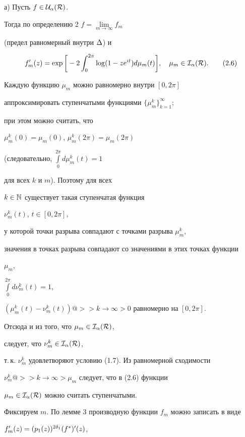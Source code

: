 \begin{pf}


а) Пусть $f\in\cal U_\alpha(R)$.


Тогда по определению 2\; $f=\lim\limits_{m\to\infty} f_m$


(предел равномерный внутри $\Delta$) и


\begin{equation}


f'_m(z)=\exp\bigg[-2\int_0^{2\pi}\log (1-z\et)d\mu_m(t)\bigg],\quad


\mu_m\in\cal I_\al(R). \tag{2.6}


\end{equation}


Каждую функцию $\mu_m$ можно равномерно внутри $[0,2\pi]$


аппроксимировать ступенчатыми функциями $\{\mu_m^k\}_{k=1}^\infty;$


при этом можно считать, что


$\mu_m^k(0)=\mu_m(0)$, $\mu_m^k(2\pi)=\mu_m(2\pi)$


(следовательно, $\int\limits_0^{2\pi}d\mu_m^k(t)=1$


для всех $k$ и $m$). Поэтому для всех


$k\in\Bbb N$ существует такая ступенчатая функция


$\nu_m^k(t)$, $t\in[0,2\pi]$,


у которой точки разрыва совпадают с точками разрыва $\mu_m^k$,


значения в точках разрыва совпадают со значениями в этих точках функции


$\mu_m$,


$\int\limits_0^{2\pi}d\nu_m^k(t)=1$, 


$(\mu_m^k(t)-\nu_m^k(t))@>>k\to \infty> 0$ равномерно на $[0,2\pi]$.


Отсюда и из того, что $\mu_m\in\cal I_\alpha(R)$,


следует, что $\nu_m^k\in\cal I_\alpha(R)$,


т.\,к. $\nu_m^k$ удовлетворяют условию (1.7). Из равномерной сходимости


$\nu_m^k@>>k\to \infty>\mu_m$ следует, что в (2.6) функции


$\mu_m\in\cal I_\alpha(R)$ можно считать ступенчатыми.





Фиксируем $m$. По лемме 3 производную функции $f_m$ можно записать в виде


$f'_m(z)=(p_1(z))^{2\delta_1}(f^*)'(z)$,



\end{pf}
